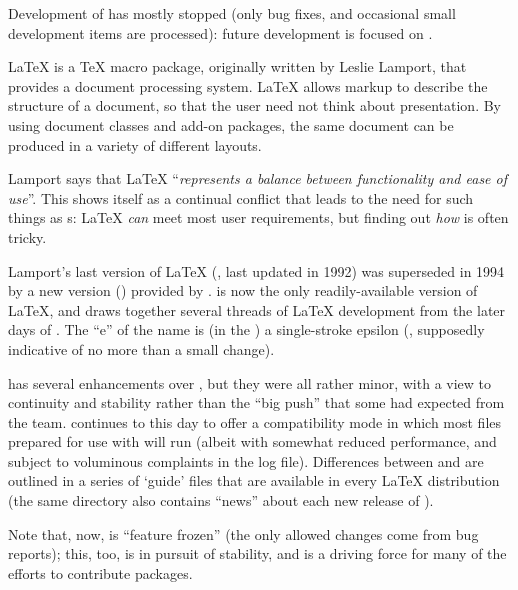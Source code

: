 Development of \PDFTeX{} has mostly stopped (only bug fixes, and
occasional small development items are processed): future development
is focused on .


\LaTeX{} is a \TeX{} macro package, originally written by Leslie Lamport, that
provides a document processing system.  \LaTeX{} allows markup to
describe the structure of a document, so that the user
need not think about presentation. By using document classes and
add-on packages, the same document can be produced in a variety of
different layouts.

Lamport says that \LaTeX{}
``\emph{represents a balance between functionality and ease of use}''.
This shows itself as a continual conflict that leads to
the need for such things as s: \LaTeX{} \emph{can} 
meet most user requirements, but finding out \emph{how} is often
tricky.


Lamport's last version of \LaTeX{} (\LaTeXo{}, last updated in 1992)
was superseded in 1994 by a new version (\LaTeXe{}) provided by
.
\LaTeXe{} is now the only readily-available version of
\LaTeX{}, and draws together several threads of \LaTeX{} development
from the later days of \LaTeXo{}.  The ``e'' of the name is (in the
)
a single-stroke epsilon
(, supposedly
indicative of no more than a small change).

\LaTeXe{} has several enhancements over \LaTeXo{}, but they were all
rather minor, with a view to continuity and stability rather than the
``big push'' that some had expected from the team.  \LaTeXe{}
continues to this day to offer a compatibility mode in which most
files prepared for use with \LaTeXo{} will run (albeit with somewhat
reduced performance, and subject to voluminous complaints in the log
file).  Differences between \LaTeXe{} and \LaTeXo{} are
outlined in a series of `guide' files that are available in every
\LaTeX{} distribution (the same directory also contains ``news'' about
each new release of \LaTeXe{}).

Note that, now, \latexe{} is ``feature frozen'' (the only allowed
changes come from bug reports); this, too, is in pursuit of stability,
and is a driving force for many of the efforts to contribute \latex{}
packages.
\begin{ctanrefs}
\item[\nothtml{\rmfamily}\LaTeX{} guides and news]
\end{ctanrefs}

